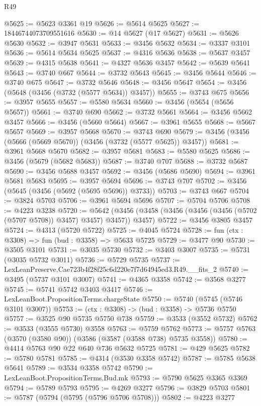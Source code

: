 \begin{lexlean}{R49}
\begin{coremodule}
@5625 := @5623 @3361 @19
@5626 := @5614 @5625
@5627 := 18446744073709551616
@5630 := @14 @5627 (@17 @5627)
@5631 := @5626 @5630
@5632 := @3947 @5631
@5633 := @3456 @5632
@5634 := @3337 @3101
@5636 := @5614 @5634 @5625
@5637 := @4316 @5636
@5638 := @5637 @3457
@5639 := @4315 @5638
@5641 := @4327 @5636 @3457
@5642 := @5639 @5641
@5643 := @3740 @667
@5644 := @3732 @5643
@5645 := @3456 @5644
@5646 := @3740 @675
@5647 := @3732 @5646
@5648 := @3456 @5647
@5654 := @3456 (@5648 (@3456 (@3732 (@5577 @5634)) @3457))
@5655 := @3743 @675
@5656 := @3957 @5655
@5657 := @5580 @5634
@5660 := @3456 (@5654 (@5656 @5657))
@5661 := @3740 @690
@5662 := @3732 @5661
@5664 := @3456 @5662 @3457
@5666 := @3456 (@5660 @5664)
@5667 := @3961 @5655
@5668 := @5667 @5657
@5669 := @3957 @5668
@5670 := @3743 @690
@5679 := @3456 (@3456 (@5666 (@5669 @5670)) (@3456 (@3732 (@5577 @5625)) @3457))
@5681 := @3961 @5668 @5670
@5682 := @3957 @5681
@5683 := @5580 @5625
@5686 := @3456 (@5679 (@5682 @5683))
@5687 := @3740 @707
@5688 := @3732 @5687
@5690 := @3456 @5688 @3457
@5692 := @3456 (@5686 @5690)
@5694 := @3961 @5681 @5683
@5695 := @3957 @5694
@5696 := @3743 @707
@5702 := @3456 (@5645 (@3456 (@5692 (@5695 @5696)) @3733))
@5703 := @3743 @667
@5704 := @3824 @5703
@5706 := @3961 @5694 @5696
@5707 := @5704 @5706
@5708 := @4223 @3238
@5720 := @5642 (@3456 (@3458 (@3456 (@3456 (@3456 (@5702 (@5707 @5708)) @3457) @3457) @3457)) @3457)
@5722 := @3456 @3805 @3457
@5724 := @4313 (@5720 @5722)
@5725 := @4045 @5724
@5728 := fun (ctx : @3308) => fun (bud : @3358) => @5633 @5725
@5729 := @3477 @90
@5730 := @3505 @3101
@5731 := @3035 @5730
@5732 := @3403 @3007
@5735 := @5731 (@3035 @5732 @3011)
@5736 := @5729 @5735
@5737 := LexLeanPreserve.Cae723b4f28f25c6d220e7f7d64945ed3.R49.__fits_2
@5740 := @3495 (@5737 @3101 @3007)
@5741 := @4365 @3358
@5742 := @3568 @3277
@5745 := @5741 @5742 @3403 @3417
@5746 := LexLeanBoot.PropositionTerms.chargeState
@5750 := @5740 (@5745 (@5746 @3101 @3007))
@5753 := (ctx : @3308) -> (bud : @3358) -> @5736 @5750
@5757 := @3525 @90 @5735 @5750 @738
@5759 := @3533 (@3552 @5732)
@5762 := @3533 (@3555 @5730) @3558
@5763 := @5759 @5762
@5773 := @5757 @5763 (@3570 (@3580 @90)) (@3586 (@3587 (@3588 @738) @5735 @3558))
@5780 := @4414 @5763 @90 @22 @640 @736 @5632 @5725
@5781 := @429 @5625
@5782 := @5780 @5781
@5785 := @4314 (@3530 @3358 @5742)
@5787 := @5785 @5638 @5641
@5789 := @3534 @3358 @5742
@5790 := LexLeanBoot.PropositionTerms.Bud.mk
@5793 := @5790 @5625 @3365 @3369
@5794 := @5789 @5793
@5795 := @4269 @3277
@5796 := @3829 @5703
@5801 := @5787 (@5794 (@5795 (@5796 @5706 @5708)))
@5802 := @4223 @3277

\end{coremodule}
\end{lexlean}

